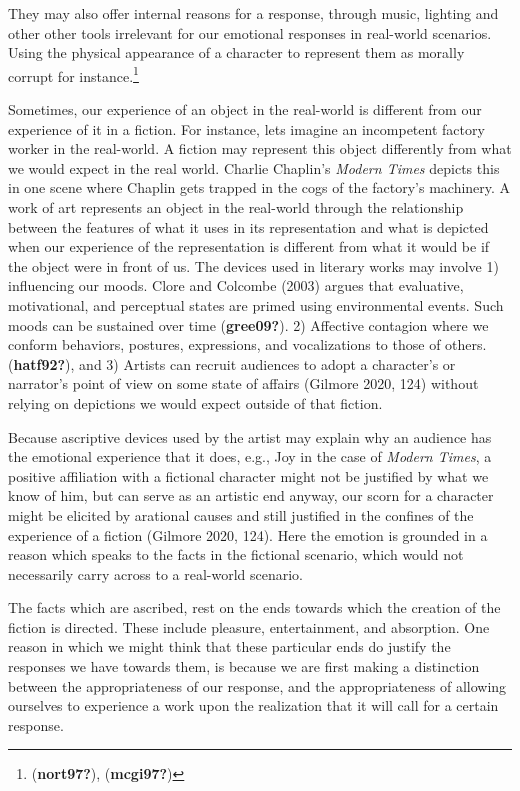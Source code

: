 \documentclass[12pt]{book}
\theoremstyle{definition}
\theoremstyle{remark}
\begin{document}
They may also offer internal reasons for a response, through music, lighting and other other tools irrelevant for our emotional responses in real-world scenarios. Using the physical appearance of a character to represent them as morally corrupt for instance.\footnote{(\textbf{nort97?}), (\textbf{mcgi97?})}

Sometimes, our experience of an object in the real-world is different from our experience of it in a fiction. For instance, lets imagine an incompetent factory worker in the real-world. A fiction may represent this object differently from what we would expect in the real world. Charlie Chaplin's \emph{Modern Times} depicts this in one scene where Chaplin gets trapped in the cogs of the factory's machinery. A work of art represents an object in the real-world through the relationship between the features of what it uses in its representation and what is depicted when our experience of the representation is different from what it would be if the object were in front of us. The devices used in literary works may involve 1) influencing our moods. Clore and Colcombe (2003) argues that evaluative, motivational, and perceptual states are primed using environmental events. Such moods can be sustained over time (\textbf{gree09?}). 2) Affective contagion where we conform behaviors, postures, expressions, and vocalizations to those of others. (\textbf{hatf92?}), and 3) Artists can recruit audiences to adopt a character's or narrator's point of view on some state of affairs (Gilmore 2020, 124) without relying on depictions we would expect outside of that fiction.

Because ascriptive devices used by the artist may explain why an audience has the emotional experience that it does, e.g., Joy in the case of \emph{Modern Times}, a positive affiliation with a fictional character might not be justified by what we know of him, but can serve as an artistic end anyway, our scorn for a character might be elicited by arational causes and still justified in the confines of the experience of a fiction (Gilmore 2020, 124). Here the emotion is grounded in a reason which speaks to the facts in the fictional scenario, which would not necessarily carry across to a real-world scenario.

The facts which are ascribed, rest on the ends towards which the creation of the fiction is directed. These include pleasure, entertainment, and absorption. One reason in which we might think that these particular ends do justify the responses we have towards them, is because we are first making a distinction between the appropriateness of our response, and the appropriateness of allowing ourselves to experience a work upon the realization that it will call for a certain response.
\end{document}
